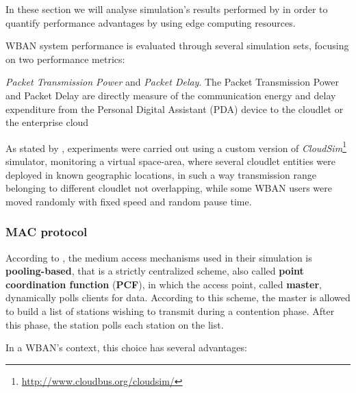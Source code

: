 \documentclass[sigchi]{acmart}
\begin{document}
In these section we will analyse simulation's results performed by \citet{MSAReport} in order to quantify performance advantages by using edge computing resources. 

WBAN system performance is evaluated through several simulation sets, focusing on two performance metrics:

\vspace{0.3cm}

\begin{quoting}[font=itshape, begintext={``}, endtext={''\cite[par.~4.2]{MSAReport}}]
\textit{Packet Transmission Power} and \textit{Packet Delay}. The Packet Transmission Power and Packet Delay are directly measure of the communication energy and delay expenditure from the Personal Digital Assistant (PDA) device to the cloudlet or the enterprise cloud
\end{quoting}

\vspace{0.3cm}

As stated by \citet{MSAReport}, experiments were carried out using a custom version of \textit{CloudSim}\footnote{\url{http://www.cloudbus.org/cloudsim/}} simulator, monitoring a virtual space-area, where several cloudlet entities were deployed in known geographic locations, in such a way transmission range belonging to different cloudlet not overlapping, while some WBAN users were moved randomly with fixed speed and random pause time.

\subsubsection{MAC protocol}

According to \citet{MSAReport}, the medium access mechanisms used in their simulation is \textbf{pooling-based}, that is a strictly centralized scheme, also called \textbf{point coordination function} (\textbf{PCF}), in which the access point, called \textbf{master}, dynamically polls clients for data. According to this scheme, the master is allowed to build a list of stations wishing to transmit during a contention phase. After this phase, the station polls each station on the list.

In a WBAN's context, this choice has several advantages:
\end{document}
